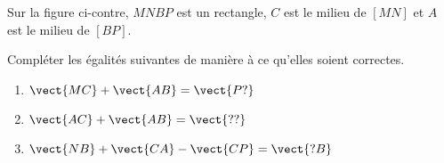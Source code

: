
\begin{exercice}\label{exosmath-0297}

    \begin{multicols}{2}
        Sur la figure ci-contre, \( MNBP\) est un rectangle, \( C\) est le milieu de \( [MN]\) et $A$ est le milieu de \( [BP]\). 

    \columnbreak


    \begin{center}

    \end{center}

    \end{multicols}
    Compléter les égalités suivantes de manière à ce qu'elles soient correctes.
    \begin{multicols}{3}
        \begin{enumerate}
            \item
                \( \vect{ MC }+\vect{ AB }=\vect{ P? }\)
            \item
                \( \vect{ AC }+\vect{ AB }=\vect{ ?? }\)
            \item
                \( \vect{ NB }+\vect{ CA }-\vect{ CP }=\vect{ ?B }\)
        \end{enumerate}
    \end{multicols}

\end{exercice}
